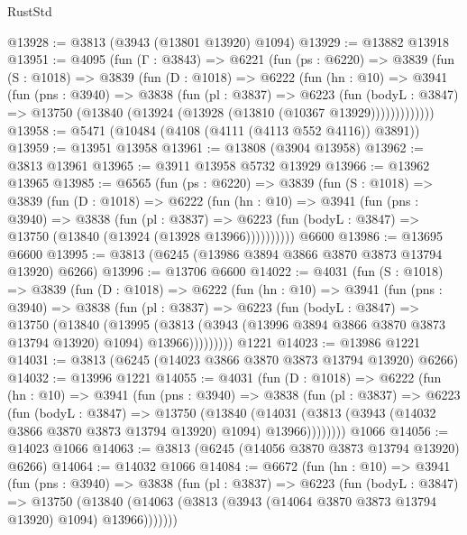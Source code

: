 \begin{lexlean}{RustStd}
\begin{coremodule}
{\begin{coremodule}
{{{{{{{{{{{{{{{{{{{{{{{{{{{{{{{{{{{@13928 := @3813 (@3943 (@13801 @13920) @1094)
@13929 := @13882 @13918
@13951 := @4095
    (fun (Γ : @3843) =>
    @6221
      (fun (ps : @6220) =>
      @3839
        (fun (S : @1018) =>
        @3839
          (fun (D : @1018) =>
          @6222
            (fun (hn : @10) =>
            @3941
              (fun (pns : @3940) =>
              @3838
                (fun (pl : @3837) =>
                @6223
                  (fun (bodyL : @3847) =>
                  @13750 (@13840 (@13924 (@13928 (@13810 (@10367 @13929)))))))))))))
@13958 := @5471 (@10484 (@4108 (@4111 (@4113 @552 @4116)) @3891))
@13959 := @13951 @13958
@13961 := @13808 (@3904 @13958)
@13962 := @3813 @13961
@13965 := @3911 @13958 @5732 @13929
@13966 := @13962 @13965
@13985 := @6565
    (fun (ps : @6220) =>
    @3839
      (fun (S : @1018) =>
      @3839
        (fun (D : @1018) =>
        @6222
          (fun (hn : @10) =>
          @3941
            (fun (pns : @3940) =>
            @3838
              (fun (pl : @3837) =>
              @6223 (fun (bodyL : @3847) => @13750 (@13840 (@13924 (@13928 @13966))))))))))
    @6600
@13986 := @13695 @6600
@13995 := @3813 (@6245 (@13986 @3894 @3866 @3870 @3873 @13794 @13920) @6266)
@13996 := @13706 @6600
@14022 := @4031
    (fun (S : @1018) =>
    @3839
      (fun (D : @1018) =>
      @6222
        (fun (hn : @10) =>
        @3941
          (fun (pns : @3940) =>
          @3838
            (fun (pl : @3837) =>
            @6223
              (fun (bodyL : @3847) =>
              @13750
                (@13840
                  (@13995
                    (@3813
                      (@3943 (@13996 @3894 @3866 @3870 @3873 @13794 @13920) @1094)
                      @13966)))))))))
    @1221
@14023 := @13986 @1221
@14031 := @3813 (@6245 (@14023 @3866 @3870 @3873 @13794 @13920) @6266)
@14032 := @13996 @1221
@14055 := @4031
    (fun (D : @1018) =>
    @6222
      (fun (hn : @10) =>
      @3941
        (fun (pns : @3940) =>
        @3838
          (fun (pl : @3837) =>
          @6223
            (fun (bodyL : @3847) =>
            @13750
              (@13840
                (@14031 (@3813 (@3943 (@14032 @3866 @3870 @3873 @13794 @13920) @1094) @13966))))))))
    @1066
@14056 := @14023 @1066
@14063 := @3813 (@6245 (@14056 @3870 @3873 @13794 @13920) @6266)
@14064 := @14032 @1066
@14084 := @6672
    (fun (hn : @10) =>
    @3941
      (fun (pns : @3940) =>
      @3838
        (fun (pl : @3837) =>
        @6223
          (fun (bodyL : @3847) =>
          @13750
            (@13840 (@14063 (@3813 (@3943 (@14064 @3870 @3873 @13794 @13920) @1094) @13966)))))))
}}}}}}}}}}}}}}}}}}}}}}}}}}}}}}}}}}}
\end{coremodule}}
\end{coremodule}
\end{lexlean}
